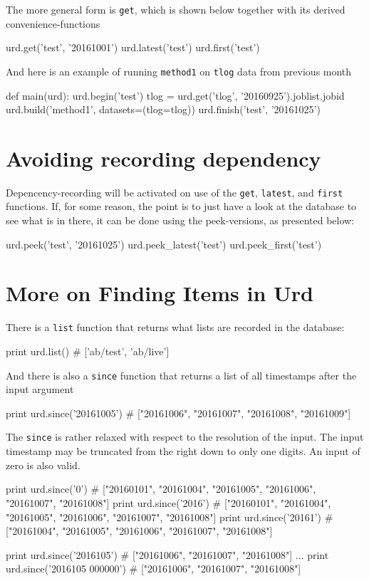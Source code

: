 The more general form is \texttt{get}, which is shown below together
with its derived convenience-functions\\
\begin{python}
  urd.get('test', '20161001')
  urd.latest('test')
  urd.first('test')
\end{python}
And here is an example of running \texttt{method1} on \texttt{tlog} data
from previous month\\
\begin{python}
def main(urd):
  urd.begin('test')
  tlog = urd.get('tlog', '20160925').joblist.jobid
  urd.build('method1', datasets=(tlog=tlog))
  urd.finish('test', '20161025')
\end{python}



\section{Avoiding recording dependency}
Depencency-recording will be activated on use of the \texttt{get},
\texttt{latest}, and \texttt{first} functions.  If, for some reason,
the point is to just have a look at the database to see what is in
there, it can be done using the peek-versions, as presented below:\\
\begin{python}
  urd.peek('test', '20161025')
  urd.peek_latest('test')
  urd.peek_first('test')
\end{python}



\newpage
\section{More on Finding Items in Urd}
There is a \texttt{list} function that returns what lists are recorded
in the database:\\
\begin{pythonBEG}
  print urd.list()
  # ['ab/test', 'ab/live']
\end{pythonBEG}
And there is also a \texttt{since} function that returns a list of all
timestamps after the input argument\\
\begin{pythonMID}
  print urd.since('20161005')
  # ["20161006", "20161007", "20161008", "20161009"]
\end{pythonMID}
The \texttt{since} is rather relaxed with respect to the resolution of
the input.  The input timestamp may be truncated from the right down
to only one digits.  An input of zero is also valid.\\
\begin{pythonEND}
  print urd.since('0')
  # ["20160101", "20161004", "20161005", "20161006", "20161007", "20161008"]
  print urd.since('2016')
  # ["20160101", "20161004", "20161005", "20161006", "20161007", "20161008"]
  print urd.since('20161')
  # ["20161004", "20161005", "20161006", "20161007", "20161008"]

  print urd.since('2016105')
  # ["20161006", "20161007", "20161008"]
  ...
  print urd.since('2016105 000000')
  # ["20161006", "20161007", "20161008"]
\end{pythonEND}



